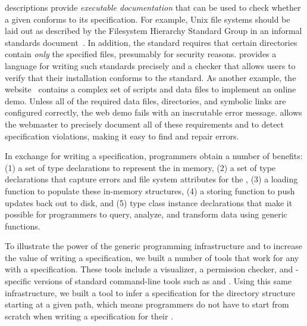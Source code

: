 \forest{} descriptions provide {\em executable documentation} that can
be used to check whether a given \filestore{} conforms to its
specification.  For example, Unix file systems should be laid out as
described by the Filesystem Hierarchy Standard Group in an informal
standards document~\cite{fsh}.  In addition, the standard requires that certain
directories contain \textit{only} the specified files, presumably for
security reasons. \forest{} provides a language for writing such
standards precisely and a checker that allows users to verify that
their installation conforms to the standard.  As another example, the
\pads{} website~\cite{padsweb} contains a complex set of scripts and
data files to implement an online demo.  Unless all of the required
data files, directories, and symbolic links are configured correctly,
the web demo fails with an inscrutable error message.  \forest{}
allows the \pads{} webmaster to precisely document all of these
requirements and to detect specification violations, making it easy to
find and repair errors.


In exchange for writing a \forest{} specification,  programmers obtain
a number of benefits:
(1) a set of type declarations to represent the \filestore{} in memory,
(2) a set of type declarations that capture errors and file system attributes for the \filestore{},
(3) a loading function to populate these in-memory structures, 
(4) a storing function to push updates back out to disk, and
(5) type class instance declarations that make it possible for
   programmers to query, analyze, and transform \filestore{} data
   using generic functions.

To illustrate the power of the generic programming infrastructure and
to increase the value of writing a \forest{} specification, we built a
number of tools that work for any \filestore{} with a
\forest{} specification.  These tools include a \filestore{}
visualizer, a permission checker, and \filestore{}-specific versions
of standard command-line tools such as  and .
Using this same infrastructure, we built a tool to infer
a \forest{} specification for the directory structure starting at a
given path, which means programmers do
not have to start from scratch when writing a specification for their
\filestores{}. 

